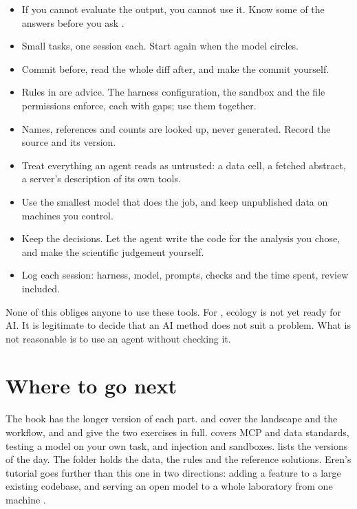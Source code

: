 \documentclass[11pt,a4paper]{article}
\begin{document}
\begin{itemize}
  \item If you cannot evaluate the output, you cannot use it. Know some of
    the answers before you ask \parencite{eren2026agenticcoding}.
  \item Small tasks, one session each. Start again when the model circles.
  \item Commit before, read the whole diff after, and make the commit
    yourself.
  \item Rules in  are advice. The harness configuration, the
    sandbox and the file permissions enforce, each with gaps; use them
    together.
  \item Names, references and counts are looked up, never generated. Record
    the source and its version.
  \item Treat everything an agent reads as untrusted: a data cell, a fetched
    abstract, a server's description of its own tools.
  \item Use the smallest model that does the job, and keep unpublished data
    on machines you control.
  \item Keep the decisions. Let the agent write the code for the analysis you
    chose, and make the scientific judgement yourself.
  \item Log each session: harness, model, prompts, checks and the time spent,
    review included.
\end{itemize}

None of this obliges anyone to use these tools. For
\textcite{mishra2026notready}, ecology is not yet ready for AI. It is
legitimate to decide that an AI method does not suit a problem. What is not
reasonable is to use an agent without checking it.

\section*{Where to go next}

The book has the longer version of each part. \bkLandscape{} and
\bkAgentic{} cover the landscape and the workflow, and \bkSession{} and
\bkLiterature{} give the two exercises in full. \bkData{} covers MCP and data
standards, \bkTesting{} testing a model on your own task, and \bkSecurity{}
injection and sandboxes. \bkStateOfPlay{} lists the versions of the day. The
 folder holds the data, the rules and the reference solutions.
Eren's tutorial goes further than this one in two directions: adding a
feature to a large existing codebase, and serving an open model to a whole
laboratory from one machine \parencite{eren2026agenticcoding}.

\printbibliography
\end{document}
